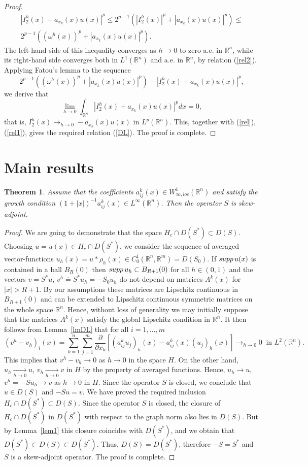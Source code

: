\documentclass[10pt,a4paper]{amsart}
\newtheorem{theorem}{Theorem}[section]
\numberwithin{equation}{section}
\newcommand{\R}{{\mathbb R}}
\newcommand{\supp}{\mathop{\rm supp}}
\begin{document}
\begin{proof}
\begin{align*}
|I_2^h(x)+a_{x_k}(x)u(x)|^p\le 2^{p-1}(|I_2^h(x)|^p+|a_{x_k}(x)u(x)|^p)\le \\ 2^{p-1}((\omega^h(x))^p+|a_{x_k}(x)u(x)|^p).
\end{align*}
The left-hand side of this inequality converges as $h\to 0$ to zero a.e. in $\R^n$, while its right-hand side converges both in  $L^1(\R^n)$ and a.e. in $\R^n$, by relation (\ref{rel2}). Applying Fatou's lemma to the sequence
\[
2^{p-1}((\omega^h(x))^p+|a_{x_k}(x)u(x)|^p)-|I_2^h(x)+a_{x_k}(x)u(x)|^p,
\]
we derive that
\[
\lim_{h\to 0} \int_{\R^n}|I_2^h(x)+a_{x_k}(x)u(x)|^pdx=0,
\]
that is, $\displaystyle I_2^h(x)\mathop{\to}_{h\to 0} -a_{x_k}(x)u(x)$ in $L^p(\R^n)$. This, together with  (\ref{rel}), (\ref{rel1}), gives the required relation (\ref{DL}). The proof is complete.
\end{proof}

\section{Main results}\label{secM}


\begin{theorem}\label{thM}
Assume that the coefficients $a^k_{ij}(x)\in W^1_{\infty,loc}(\R^n)$ and satisfy the growth condition $(1+|x|)^{-1}a^k_{ij}(x)\in L^\infty(\R^n)$. Then the operator $S$ is skew-adjoint.
\end{theorem}

\begin{proof}
We are going to demonstrate that the space $H_c\cap D(S^*)\subset D(S)$. Choosing $u=u(x)\in H_c\cap D(S^*)$, we consider the sequence of averaged vector-functions $u_h(x)=u*\rho_h(x)\in C_0^1(\R^n,\R^m)=D(S_0)$. If $\supp u(x)$ is contained in a ball $B_R(0)$ then $\supp u_h\subset B_{R+1}(0)$ for all $h\in (0,1)$ and the vectors $v=S^*u$, $v^h\doteq S^* u_h=-S_0u_h$ do not depend on matrices $A^k(x)$ for $|x|>R+1$. By our assumptions these matrices are Lipschitz continuous in $B_{R+1}(0)$ and can be extended to Lipschitz continuous symmetric matrices on the whole space $\R^n$. Hence, without loss of generality we may initially suppose that the matrices $A^k(x)$ satisfy the global Lipschitz condition in $\R^n$.
It then follows from Lemma~\ref{lmDL} that for all $i=1,\ldots,m$
\[(v^h-v_h)_i(x)=\sum_{k=1}^n \sum_{j=1}^m \frac{\partial}{\partial x_k}[(a^k_{ij}u_j)_h(x)-a^k_{ij}(x)(u_j)_h(x)]
\mathop{\to}_{h\to 0} 0 \ \mbox{ in } L^2(\R^n). \]
This implies that $v^h-v_h\to 0$ as $h\to 0$ in the space $H$. On the other hand, $u_h\mathop{\to}\limits_{h\to 0} u$,  $v_h\mathop{\to}\limits_{h\to 0} v$ in $H$ by the property of averaged functions. Hence, $u_h\to u$, $v^h=-Su_h\to v$ as $h\to 0$ in $H$. Since the operator $S$ is closed, we conclude that $u\in D(S)$ and $-Su=v$. We have proved the required inclusion $H_c\cap D(S^*)\subset D(S)$. Since the operator $S$ is closed, the closure of $H_c\cap D(S^*)$ in $D(S^*)$ with respect to the graph norm also lies in $D(S)$. But by Lemma~\ref{lem1} this closure coincides with $D(S^*)$, and we obtain that $D(S^*)\subset D(S)\subset D(S^*)$. Thus, $D(S)=D(S^*)$, therefore $-S=S^*$ and $S$ is a skew-adjoint operator. The proof is complete.
\end{proof}
\end{document}
